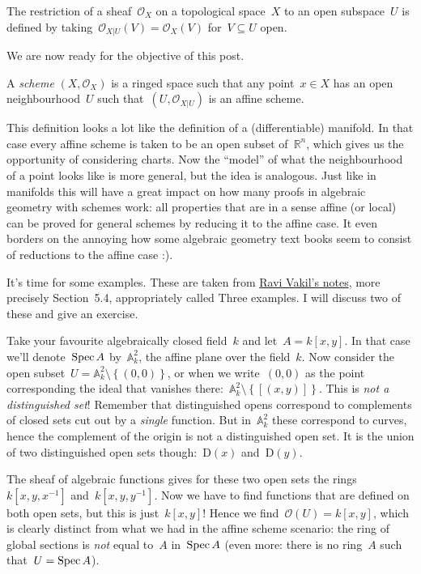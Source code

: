 \begin{definition}
  The restriction of a sheaf~$\mathcal{O}_X$ on a topological space~$X$ to an open subspace~$U$ is defined by taking~$\mathcal{O}_{X|U}(V)=\mathcal{O}_X(V)$ for~$V\subseteq U$ open.
\end{definition}

We are now ready for the objective of this post.

\begin{definition}
  A \emph{scheme} $(X,\mathcal{O}_X)$ is a ringed space such that any point~$x\in X$ has an open neighbourhood~$U$ such that~$(U,\mathcal{O}_{X|U})$ is an affine scheme.
\end{definition}

This definition looks a lot like the definition of a (differentiable) manifold. In that case every affine scheme is taken to be an open subset of~$\mathbb{R}^n$, which gives us the opportunity of considering charts. Now the ``model'' of what the neighbourhood of a point looks like is more general, but the idea is analogous. Just like in manifolds this will have a great impact on how many proofs in algebraic geometry with schemes work: all properties that are in a sense affine (or local) can be proved for general schemes by reducing it to the affine case. It even borders on the annoying how some algebraic geometry text books seem to consist of reductions to the affine case :).

It's time for some examples. These are taken from \iftex\cite{foag}\fi\ifblog \href{http://math216.wordpress.com}{Ravi Vakil's notes}\fi, more precisely Section~5.4, appropriately called Three examples. I will discuss two of these and give an exercise.

\begin{example}
  Take your favourite algebraically closed field~$k$ and let~$A=k[x,y]$. In that case we'll denote~$\operatorname{Spec} A$ by~$\mathbb{A}^2_k$, the affine plane over the field~$k$. Now consider the open subset~$U=\mathbb{A}^2_k\setminus\left\{ (0,0) \right\}$, or when we write~$(0,0)$ as the point corresponding the ideal that vanishes there:~$\mathbb{A}^2_k\setminus\left\{ \left[ (x,y) \right] \right\}$. This is \emph{not a distinguished set}! Remember that distinguished opens correspond to complements of closed sets cut out by a \emph{single} function. But in~$\mathbb{A}^2_k$ these correspond to curves, hence the complement of the origin is not a distinguished open set. It is the union of two distinguished open sets though:~$\mathrm{D}(x)$ and~$\mathrm{D}(y)$.

  The sheaf of algebraic functions gives for these two open sets the rings~$k[x,y,x^{-1}]$ and~$k[x,y,y^{-1}]$. Now we have to find functions that are defined on both open sets, but this is just~$k[x,y]$! Hence we find~$\mathcal{O}(U)=k[x,y]$, which is clearly distinct from what we had in the affine scheme scenario: the ring of global sections is \emph{not} equal to~$A$ in~$\operatorname{Spec} A$ (even more: there is no ring~$A$ such that~$U=\operatorname{Spec} A$).
\end{example}


